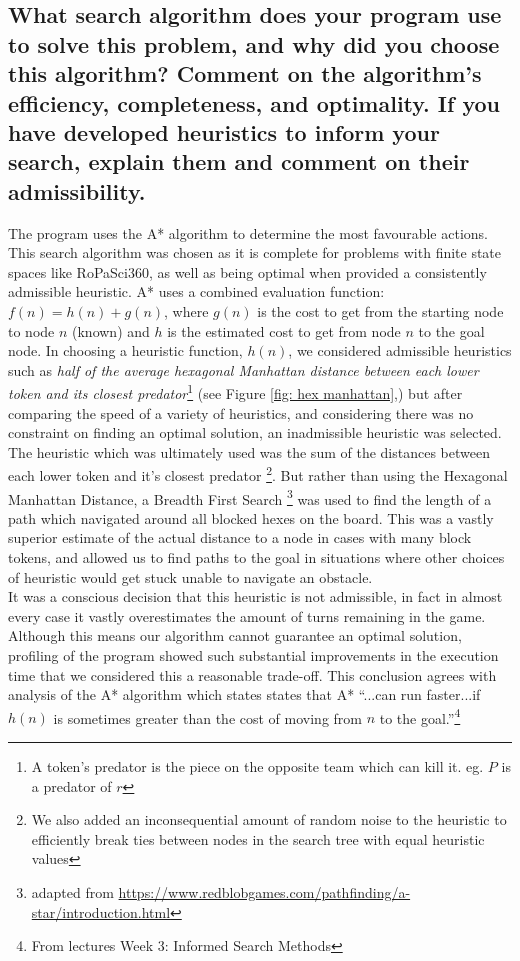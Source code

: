 \documentclass{article}
\begin{document}
\subsection*{What search algorithm does your program use to solve this problem, and why did you choose this algorithm? Comment on the algorithm’s efficiency, completeness, and optimality. If you have developed heuristics to inform your search, explain them and comment on their admissibility.}
The program uses the A* algorithm to determine the most favourable actions. This search algorithm was chosen as it is complete for problems with finite state spaces like RoPaSci360, as well as being optimal when provided a consistently admissible heuristic. A* uses a combined evaluation function: $f(n) = h(n) + g(n)$, where $g(n)$ is the cost to get from the starting node to node $n$ (known) and $h$ is the estimated cost to get from node $n$ to the goal node. In choosing a heuristic function, $h(n)$, we considered admissible heuristics such as \textit{half of the average hexagonal Manhattan distance between each lower token and its closest predator}\footnote{A token's predator is the piece on the opposite team which can kill it. eg. $P$ is a predator of $r$} (see Figure \ref{fig: hex manhattan},) but after comparing the speed of a variety of heuristics, and considering there was no constraint on finding an optimal solution, an inadmissible heuristic was selected.\\[2mm]
The heuristic which was ultimately used was the sum of the distances between each lower token and it's closest predator \footnote{We also added an inconsequential amount of random noise to the heuristic to efficiently break ties between nodes in the search tree with equal heuristic values}. But rather than using the Hexagonal Manhattan Distance, a Breadth First Search \footnote{adapted from \url{https://www.redblobgames.com/pathfinding/a-star/introduction.html}} was used to find the length of a path which navigated around all blocked hexes on the board. This was a vastly superior estimate of the actual distance to a node in cases with many block tokens, and allowed us to find paths to the goal in situations where other choices of heuristic would get stuck unable to navigate an obstacle.\\[2mm]
It was a conscious decision that this heuristic is not admissible, in fact in almost every case it vastly overestimates the amount of turns remaining in the game. Although this means our algorithm cannot guarantee an optimal solution, profiling of the program showed such substantial improvements in the execution time that we considered this a reasonable trade-off. This conclusion agrees with analysis of the A* algorithm which states states that A* ``...can run faster...if $h(n)$ is sometimes greater than the cost of moving from $n$ to the goal.''\footnote{From lectures Week 3: Informed Search Methods}
\end{document}

